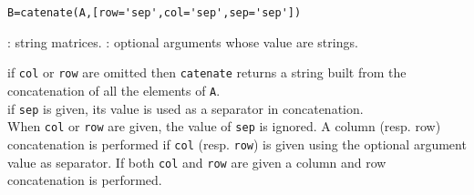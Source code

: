 
\begin{mandesc}
\end{mandesc}

\begin{calling_sequence}
\begin{verbatim}
B=catenate(A,[row='sep',col='sep',sep='sep'])
\end{verbatim}
\end{calling_sequence}
\begin{parameters}
  \begin{varlist}
    : string matrices.
    : optional arguments whose value are strings.
  \end{varlist}
\end{parameters}

\begin{mandescription} 
  if \verb+col+ or \verb+row+ are omitted then \verb+catenate+
  returns a string built from the concatenation of all the 
  elements of \verb+A+. \\
  if \verb+sep+ is given, its value 
  is used as a separator in concatenation. \\
  When \verb+col+ or \verb+row+  are given, the value of \verb+sep+
  is ignored. A column (resp. row) concatenation is 
  performed if \verb+col+ (resp. \verb+row+) is given using the optional
  argument value as separator. If both \verb+col+ and \verb+row+ 
  are given a column and row concatenation is performed. 
\end{mandescription}
  
\begin{examples}
  \begin{program}
  \end{program}
\end{examples}

\begin{manseealso}
\end{manseealso}
